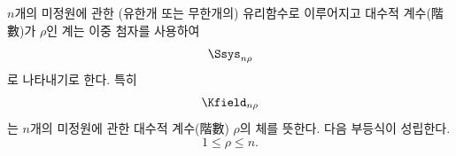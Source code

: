 
$n$개의 미정원에 관한 (유한개 또는 무한개의) 유리함수로 이루어지고 대수적 계수(階數)가 $\rho$인 계는 이중 첨자를 사용하여
\[
  \Ssys_{n\rho}
\]
로 나타내기로 한다. 특히
\[
  \Kfield_{n\rho}
\]
는 $n$개의 미정원에 관한 대수적 계수(階數) $\rho$의 체를 뜻한다. 다음 부등식이 성립한다.
\[
  1\leq \rho\leq n.
\]
